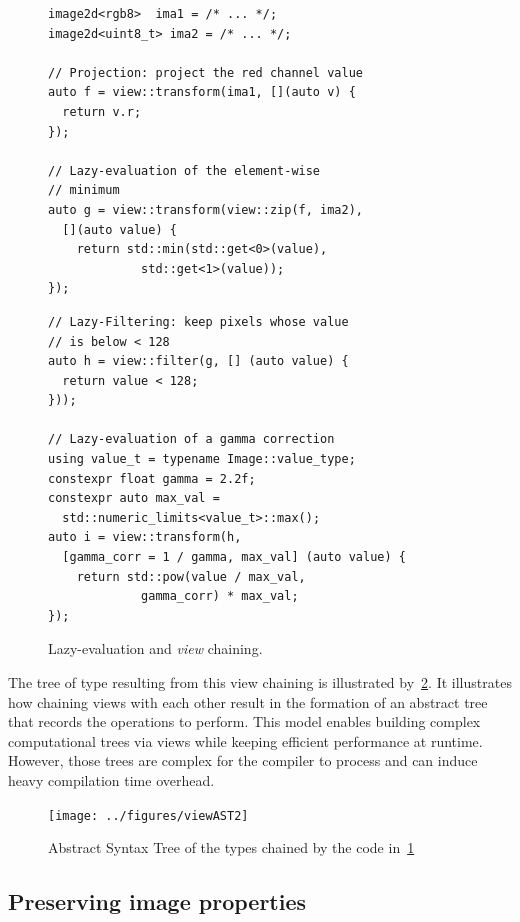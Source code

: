 \begin{figure}[htbp]
  \begin{minipage}[l]{0.48\linewidth}
    \begin{verbatim}
image2d<rgb8>  ima1 = /* ... */;
image2d<uint8_t> ima2 = /* ... */;

// Projection: project the red channel value
auto f = view::transform(ima1, [](auto v) {
  return v.r;
});

// Lazy-evaluation of the element-wise
// minimum
auto g = view::transform(view::zip(f, ima2),
  [](auto value) {
    return std::min(std::get<0>(value),
             std::get<1>(value));
});
\end{verbatim}
  \end{minipage}
  \hfill
  \begin{minipage}[l]{0.48\linewidth}
    \begin{verbatim}
// Lazy-Filtering: keep pixels whose value
// is below < 128
auto h = view::filter(g, [] (auto value) {
  return value < 128;
}));

// Lazy-evaluation of a gamma correction
using value_t = typename Image::value_type;
constexpr float gamma = 2.2f;
constexpr auto max_val =
  std::numeric_limits<value_t>::max();
auto i = view::transform(h,
  [gamma_corr = 1 / gamma, max_val] (auto value) {
    return std::pow(value / max_val,
             gamma_corr) * max_val;
});
\end{verbatim}
  \end{minipage}

  \caption{Lazy-evaluation and \emph{view} chaining.}
  \label{fig:lazy}
\end{figure}

The tree of type resulting from this view chaining is illustrated by~\cref{fig:viewAST}. It illustrates how chaining
views with each other result in the formation of an abstract tree that records the operations to perform. This model
enables building complex computational trees via views while keeping efficient performance at runtime. However, those
trees are complex for the compiler to process and can induce heavy compilation time overhead.

\begin{figure}[htb]
  \centering
  \texttt{[image: ../figures/viewAST2]}
  \caption{Abstract Syntax Tree of the types chained by the code in~\cref{fig:lazy}}
  \label{fig:viewAST}
\end{figure}


\subsection{Preserving image properties}

